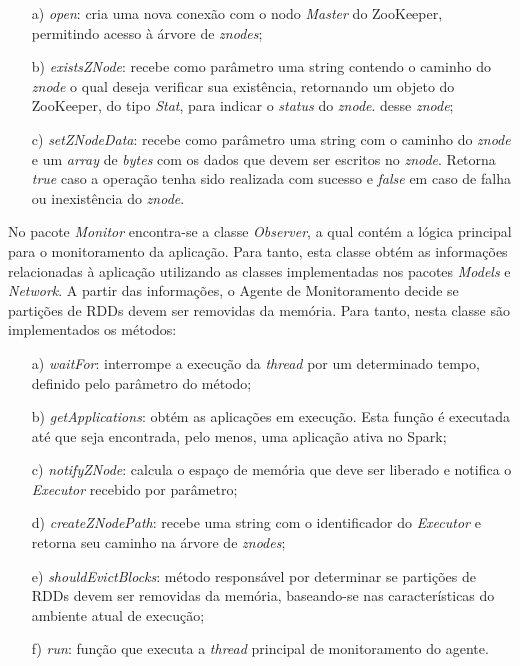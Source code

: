 \begin{enumerate}
    \item[a)] \textit{open}: cria uma nova conexão com o nodo \textit{Master} do ZooKeeper, permitindo acesso à árvore de \textit{znodes};
    \item[b)] \textit{existsZNode}: recebe como parâmetro uma string contendo o caminho do \textit{znode} o qual deseja verificar sua existência, retornando um objeto do ZooKeeper, do tipo \textit{Stat}, para indicar o \textit{status} do \textit{znode}.
    desse \textit{znode};
    \item[c)] \textit{setZNodeData}: recebe como parâmetro uma string com o caminho do \textit{znode} e um \textit{array} de \textit{bytes} com os dados que devem ser escritos no \textit{znode}. Retorna \textit{true} caso a operação tenha sido realizada com sucesso e \textit{false} em caso de falha ou inexistência do \textit{znode}.
\end{enumerate}

No pacote \textit{Monitor} encontra-se a classe \textit{Observer}, a qual contém a lógica principal para o monitoramento da aplicação. Para tanto, esta classe obtém as informações relacionadas à aplicação utilizando as classes implementadas nos pacotes \textit{Models} e \textit{Network}. A partir das informações, o Agente de Monitoramento decide se partições de RDDs devem ser removidas da memória. Para tanto, nesta classe são implementados os métodos:

\begin{enumerate}
    \item[a)] \textit{waitFor}: interrompe a execução da \textit{thread} por um determinado tempo, definido pelo parâmetro do método; 
    \item[b)] \textit{getApplications}: obtém as aplicações em execução. Esta função é executada até que seja encontrada, pelo menos, uma aplicação ativa no Spark;  
    \item[c)] \textit{notifyZNode}: calcula o espaço de memória que deve ser liberado e notifica o \textit{Executor} recebido por parâmetro;
    \item[d)] \textit{createZNodePath}: recebe uma string com o identificador do \textit{Executor} e retorna seu caminho na árvore de \textit{znodes};
    \item[e)] \textit{shouldEvictBlocks}: método responsável por determinar se partições de RDDs devem ser removidas da memória, baseando-se nas características do ambiente atual de execução;
    \item[f)] \textit{run}: função que executa a \textit{thread} principal de monitoramento do agente.
\end{enumerate}



